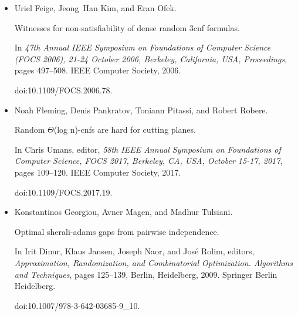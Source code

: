\begin{itemize}
Uriel Feige.


Relations between average case complexity and approximation
complexity.


In \emph{Proceedings of the 17th Annual IEEE Conference on
Computational Complexity, Montréal, Québec, Canada, May 21-24,
2002}, page 5. IEEE Computer Society, 2002.


doi:10.1109/CCC.2002.10006.





\item[] 
[19]

Uriel Feige, Jeong Han Kim, and Eran Ofek.


Witnesses for non-satisfiability of dense random 3cnf formulas.


In \emph{47th Annual IEEE Symposium on Foundations of Computer
Science (FOCS 2006), 21-24 October 2006, Berkeley, California, USA,
Proceedings}, pages 497–508. IEEE Computer Society,
2006.


doi:10.1109/FOCS.2006.78.





\item[] 
[20]

Noah Fleming, Denis Pankratov, Toniann Pitassi, and Robert Robere.


Random $\Theta$(log n)-cnfs are hard for cutting planes.


In Chris Umans, editor, \emph{58th IEEE Annual Symposium on
Foundations of Computer Science, FOCS 2017, Berkeley, CA, USA, October
15-17, 2017}, pages 109–120. IEEE Computer Society, 2017.


doi:10.1109/FOCS.2017.19.





\item[] 
[21]

Konstantinos Georgiou, Avner Magen, and Madhur Tulsiani.


Optimal sherali-adams gaps from pairwise independence.


In Irit Dinur, Klaus Jansen, Joseph Naor, and José Rolim,
editors, \emph{Approximation, Randomization, and Combinatorial Optimization.
Algorithms and Techniques}, pages 125–139, Berlin, Heidelberg, 2009.
Springer Berlin Heidelberg.


doi:10.1007/978-3-642-03685-9\_10.






\end{itemize}

